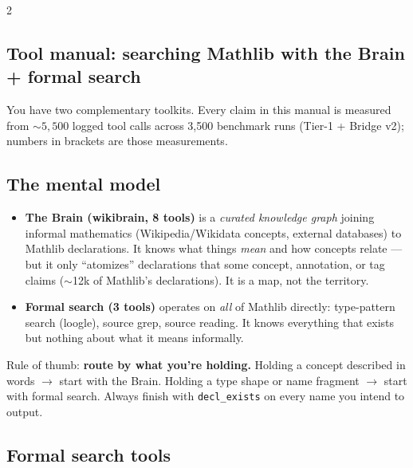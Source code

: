 \documentclass[10pt]{article}
\newcommand{\code}[1]{\texttt{#1}}
\begin{document}
{\footnotesize
\begin{multicols}{2}
\raggedright

\subsection*{Tool manual: searching Mathlib with the Brain + formal search}

You have two complementary toolkits. Every claim in this manual is measured
from ${\sim}5{,}500$ logged tool calls across 3{,}500 benchmark runs
(Tier-1 + Bridge v2); numbers in brackets are those measurements.

\subsection{The mental model}

\begin{itemize}
\item \textbf{The Brain (wikibrain, 8 tools)} is a \emph{curated knowledge
  graph} joining informal mathematics (Wikipedia/Wikidata concepts,
  external databases) to Mathlib declarations. It knows what things
  \emph{mean} and how concepts relate --- but it only ``atomizes''
  declarations that some concept, annotation, or tag claims (${\sim}$12k of
  Mathlib's declarations). It is a map, not the territory.
\item \textbf{Formal search (3 tools)} operates on \emph{all} of Mathlib
  directly: type-pattern search (loogle), source grep, source reading. It
  knows everything that exists but nothing about what it means informally.
\end{itemize}

Rule of thumb: \textbf{route by what you're holding.} Holding a concept
described in words $\to$ start with the Brain. Holding a type shape or name
fragment $\to$ start with formal search. Always finish with
\code{decl\_exists} on every name you intend to output.

\subsection{Formal search tools}


\end{multicols}}
\end{document}
